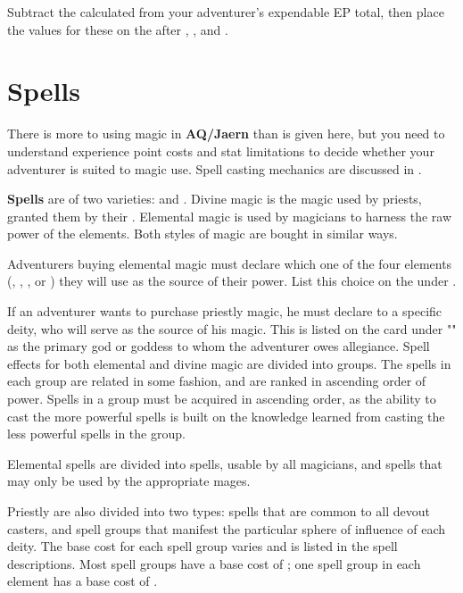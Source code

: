 \begin{multicols*}{2}
Subtract the calculated \EP from your adventurer's expendable EP total, then place the values for these on the  after , , and .
\section{Spells}
There is more to using magic in \textbf{AQ/Jaern} than is given here, but you need to understand experience point costs and stat limitations to decide whether your adventurer is suited to magic use. Spell casting mechanics are discussed in .

\textbf{Spells} are of two varieties:  and . Divine magic is the magic used by priests, granted them by their . Elemental magic is used by magicians to harness the raw power of the elements. Both styles of magic are bought in similar ways.

Adventurers buying elemental magic must declare which one of the four elements (, , , or ) they will use as the source of their power. List this choice on the  under .

If an adventurer wants to purchase priestly magic, he must declare  to a specific deity, who will serve as the source of his magic. This is listed on the card under "" as the primary god or goddess to whom the adventurer owes allegiance.
Spell effects for both elemental and divine magic are divided into groups. The spells in each group are related in some fashion, and are ranked in ascending order of power.
Spells in a group must be acquired in ascending order, as the ability to cast the more powerful spells is built on the knowledge learned from casting the less powerful spells in the group.

Elemental spells are divided into  spells, usable by all magicians, and  spells that may only be used by the appropriate mages.

Priestly  are also divided into two types:  spells that are common to all devout casters, and  spell groups that manifest the particular sphere of influence of each deity.
The base cost for each spell group varies and is listed in the spell descriptions. Most spell groups have a base cost of ; one spell group in each element has a base cost of .

\end{multicols*}
